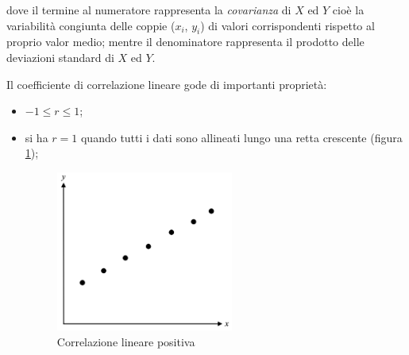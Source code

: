 dove il termine al numeratore rappresenta la \textit{covarianza} di $X$ ed $Y$ cioè la variabilità congiunta delle coppie ($x_i$, $y_i$) di valori corrispondenti rispetto al proprio valor medio; mentre il denominatore rappresenta il prodotto delle deviazioni standard di $X$ ed $Y$.

Il coefficiente di correlazione lineare gode di importanti proprietà:

\begin{itemize}
  \item $-1 \le r \le 1$;
  \item si ha $r=1$ quando tutti i dati sono allineati lungo una retta crescente (figura \ref{fig:positive_correlation});
    \begin{figure}[H]
\centering
\includegraphics[width=0.55\textwidth,height=\textheight,keepaspectratio]{img/positive_correlation.png}
\caption{Correlazione lineare positiva}
\label{fig:positive_correlation}
\end{figure}


\end{itemize}
